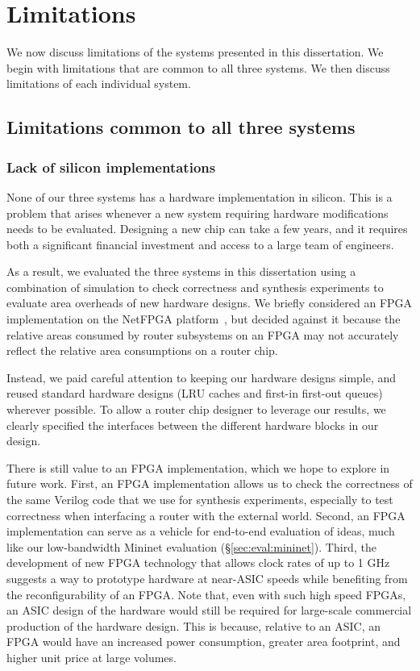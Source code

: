 \chapter{Limitations}
\label{chap:limitations}

We now discuss limitations of the systems presented in this dissertation. We
begin with limitations that are common to all three systems. We then discuss
limitations of each individual system.

\section{Limitations common to all three systems}

\subsection{Lack of silicon implementations} None of our three systems has a
hardware implementation in silicon. This is a problem that arises whenever a
new system requiring hardware modifications needs to be evaluated. Designing a
new chip can take a few years, and it requires both a significant financial
investment and access to a large team of engineers.

 As a result, we evaluated the three systems in this dissertation using a
combination of simulation to check correctness and synthesis experiments to
evaluate area overheads of new hardware designs. We briefly considered an FPGA
implementation on the NetFPGA platform~\cite{netfpga}, but decided against it
because the relative areas consumed by router subsystems on an FPGA may not
accurately reflect the relative area consumptions on a router chip.

Instead, we paid careful attention to keeping our hardware designs simple, and
reused standard hardware designs (\eg LRU caches and first-in first-out queues)
wherever possible. To allow a router chip designer to leverage our results, we
clearly specified the interfaces between the different hardware blocks in our
design.

There is still value to an FPGA implementation, which we hope to explore in
future work. First, an FPGA implementation allows us to check the correctness
of the same Verilog code that we use for synthesis experiments, especially to
test correctness when interfacing a router with the external world. Second, an
FPGA implementation can serve as a vehicle for end-to-end evaluation of ideas,
much like our low-bandwidth Mininet evaluation (\S\ref{sec:eval:mininet}).
Third, the development of new FPGA technology that allows clock rates of up to
1 GHz~\cite{hyperflex} suggests a way to prototype hardware at near-ASIC speeds
while benefiting from the reconfigurability of an FPGA. Note that, even with
such high speed FPGAs, an ASIC design of the hardware would still be required
for large-scale commercial production of the hardware design.  This is because,
relative to an ASIC, an FPGA would have an increased power consumption, greater
area footprint, and higher unit price at large volumes.

